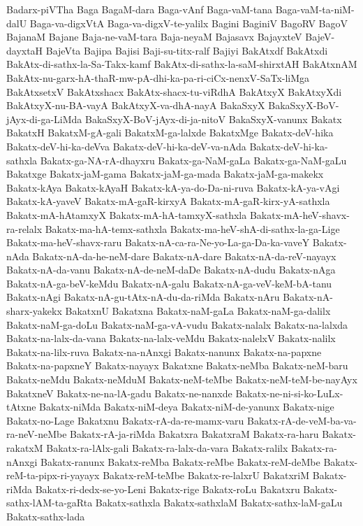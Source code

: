 {Badarx-piVTha
Baga
BagaM-dara
Baga-vAnf
Baga-vaM-tana
Baga-vaM-ta-niM-dalU
Baga-va-digxVtA
Baga-va-digxV-te-yalilx
Bagini
BaginiV
BagoRV
BagoV
BajanaM
Bajane
Baja-ne-vaM-tara
Baja-neyaM
Bajasavx
BajayxteV
BajeV-dayxtaH
BajeVta
Bajipa
Bajisi
Baji-su-titx-ralf
Bajiyi
BakAtxdf
BakAtxdi
BakAtx-di-sathx-la-Sa-Takx-kamf
BakAtx-di-sathx-la-saM-shirxtAH
BakAtxnAM
BakAtx-nu-garx-hA-thaR-mw-pA-dhi-ka-pa-ri-ciCx-nenxV-SaTx-liMga
BakAtxsetxV
BakAtxshacx
BakAtx-shacx-tu-viRdhA
BakAtxyX
BakAtxyXdi
BakAtxyX-nu-BA-vayA
BakAtxyX-va-dhA-nayA
BakaSxyX
BakaSxyX-BoV-jAyx-di-ga-LiMda
BakaSxyX-BoV-jAyx-di-ja-nitoV
BakaSxyX-vanunx
Bakatx
BakatxH
BakatxM-gA-gali
BakatxM-ga-lalxde
BakatxMge
Bakatx-deV-hika
Bakatx-deV-hi-ka-deVva
Bakatx-deV-hi-ka-deV-va-nAda
Bakatx-deV-hi-ka-sathxla
Bakatx-ga-NA-rA-dhayxru
Bakatx-ga-NaM-gaLa
Bakatx-ga-NaM-gaLu
Bakatxge
Bakatx-jaM-gama
Bakatx-jaM-ga-mada
Bakatx-jaM-ga-makekx
Bakatx-kAya
Bakatx-kAyaH
Bakatx-kA-ya-do-Da-ni-ruva
Bakatx-kA-ya-vAgi
Bakatx-kA-yaveV
Bakatx-mA-gaR-kirxyA
Bakatx-mA-gaR-kirx-yA-sathxla
Bakatx-mA-hAtamxyX
Bakatx-mA-hA-tamxyX-sathxla
Bakatx-mA-heV-shavx-ra-relalx
Bakatx-ma-hA-temx-sathxla
Bakatx-ma-heV-shA-di-sathx-la-ga-Lige
Bakatx-ma-heV-shavx-raru
Bakatx-nA-ca-ra-Ne-yo-La-ga-Da-ka-vaveY
Bakatx-nAda
Bakatx-nA-da-he-neM-dare
Bakatx-nA-dare
Bakatx-nA-da-reV-nayayx
Bakatx-nA-da-vanu
Bakatx-nA-de-neM-daDe
Bakatx-nA-dudu
Bakatx-nAga
Bakatx-nA-ga-beV-keMdu
Bakatx-nA-galu
Bakatx-nA-ga-veV-keM-bA-tanu
Bakatx-nAgi
Bakatx-nA-gu-tAtx-nA-du-da-riMda
Bakatx-nAru
Bakatx-nA-sharx-yakekx
BakatxnU
Bakatxna
Bakatx-naM-gaLa
Bakatx-naM-ga-dalilx
Bakatx-naM-ga-doLu
Bakatx-naM-ga-vA-vudu
Bakatx-nalalx
Bakatx-na-lalxda
Bakatx-na-lalx-da-vana
Bakatx-na-lalx-veMdu
Bakatx-nalelxV
Bakatx-nalilx
Bakatx-na-lilx-ruva
Bakatx-na-nAnxgi
Bakatx-nanunx
Bakatx-na-papxne
Bakatx-na-papxneY
Bakatx-nayayx
Bakatxne
Bakatx-neMba
Bakatx-neM-baru
Bakatx-neMdu
Bakatx-neMduM
Bakatx-neM-teMbe
Bakatx-neM-teM-be-nayAyx
BakatxneV
Bakatx-ne-na-lA-gadu
Bakatx-ne-nanxde
Bakatx-ne-ni-si-ko-LuLx-tAtxne
Bakatx-niMda
Bakatx-niM-deya
Bakatx-niM-de-yanunx
Bakatx-nige
Bakatx-no-Lage
Bakatxnu
Bakatx-rA-da-re-mamx-varu
Bakatx-rA-de-veM-ba-va-ra-neV-neMbe
Bakatx-rA-ja-riMda
Bakatxra
BakatxraM
Bakatx-ra-haru
Bakatx-rakatxM
Bakatx-ra-lAlx-gali
Bakatx-ra-lalx-da-vara
Bakatx-ralilx
Bakatx-ra-nAnxgi
Bakatx-ranunx
Bakatx-reMba
Bakatx-reMbe
Bakatx-reM-deMbe
Bakatx-reM-ta-pipx-ri-yayayx
Bakatx-reM-teMbe
Bakatx-re-lalxrU
BakatxriM
Bakatx-riMda
Bakatx-ri-dedx-se-yo-Leni
Bakatx-rige
Bakatx-roLu
Bakatxru
Bakatx-sathx-lAM-ta-gaRta
Bakatx-sathxla
Bakatx-sathxlaM
Bakatx-sathx-laM-gaLu
Bakatx-sathx-lada
}
